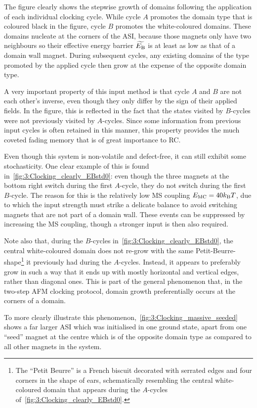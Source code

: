 The figure clearly shows the stepwise growth of domains following the application of each individual clocking cycle.
While cycle $A$ promotes the domain type that is coloured black in the figure, cycle $B$ promotes the white-coloured domains.
These domains nucleate at the corners of the ASI, because those magnets only have two neighbours so their effective energy barrier $\widetilde{E_\mathrm{B}}$ is at least as low as that of a domain wall magnet.
During subsequent cycles, any existing domains of the type promoted by the applied cycle then grow at the expense of the opposite domain type. \par
A very important property of this input method is that cycle $A$ and $B$ are not each other's inverse, even though they only differ by the sign of their applied fields.
In the figure, this is reflected in the fact that the states visited by $B$-cycles were not previously visited by $A$-cycles.
Since some information from previous input cycles is often retained in this manner, this property provides the much coveted fading memory that is of great importance to RC. \par
Even though this system is non-volatile and defect-free, it can still exhibit some stochasticity.
One clear example of this is found in~\cref{fig:3:Clocking_clearly_EBstd0}: even though the three magnets at the bottom right switch during the first $A$-cycle, they do not switch during the first $B$-cycle.
The reason for this is the relatively low MS coupling $\EMC=40\kBT$, due to which the input strength must strike a delicate balance to avoid switching magnets that are not part of a domain wall.
These events can be suppressed by increasing the MS coupling, though a stronger input is then also required. \\\par

Note also that, during the $B$-cycles in~\cref{fig:3:Clocking_clearly_EBstd0}, the central white-coloured domain does not re-grow with the same Petit-Beurre-shape\footnote{
	The ``Petit Beurre'' is a French biscuit decorated with serrated edges and four corners in the shape of ears, schematically resembling the central white-coloured domain that appears during the $A$-cycles of~\cref{fig:3:Clocking_clearly_EBstd0}.
} it previously had during the $A$-cycles.
Instead, it appears to preferably grow in such a way that it ends up with mostly horizontal and vertical edges, rather than diagonal ones.
This is part of the general phenomenon that, in the two-step AFM clocking protocol, domain growth preferentially occurs at the corners of a domain. \par
To more clearly illustrate this phenomenon,~\cref{fig:3:Clocking_massive_seeded} shows a far larger ASI which was initialised in one ground state, apart from one ``seed'' magnet at the centre which is of the opposite domain type as compared to all other magnets in the system.

